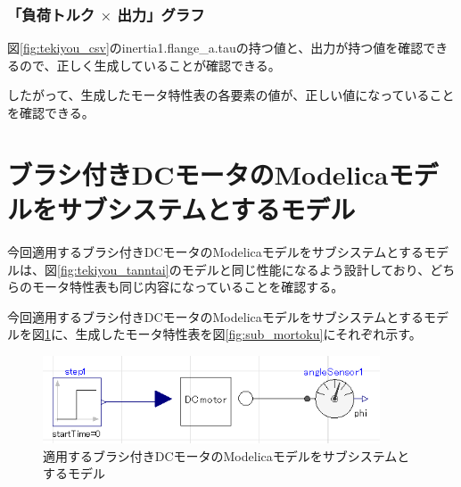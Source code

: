 \subsubsection{「負荷トルク $\times$ 出力」グラフ}
図\ref{fig:tekiyou_csv}のinertia1.flange\_a.tauの持つ値と、出力が持つ値を確認できるので、正しく生成していることが確認できる。

したがって、生成したモータ特性表の各要素の値が、正しい値になっていることを確認できる。

\section{ブラシ付きDCモータのModelicaモデルをサブシステムとするモデル}
今回適用するブラシ付きDCモータのModelicaモデルをサブシステムとするモデルは、図\ref{fig:tekiyou_tanntai}のモデルと同じ性能になるよう設計しており、どちらのモータ特性表も同じ内容になっていることを確認する。

今回適用するブラシ付きDCモータのModelicaモデルをサブシステムとするモデルを図\ref{fig:tekiyou_sub}に、生成したモータ特性表を図\ref{fig:sub_mortoku}にそれぞれ示す。

\begin{figure}[t]
	\centering
	\includegraphics[width=10cm]{./Image/tekiyou_sub.png}
	\caption{適用するブラシ付きDCモータのModelicaモデルをサブシステムとするモデル}
	\label{fig:tekiyou_sub}
\end{figure}

